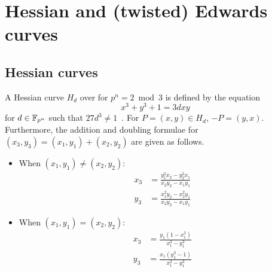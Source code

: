 %
%

\section{Hessian and (twisted) Edwards curves}

\subsection{Hessian curves}
\label{sec:hessian}

%
A Hessian curve $H_d$ over  for $p^n=2\bmod 3$ is defined by
the equation \begin{equation}
  x^3+y^3+1=3dxy \label{eq:hessian-curve} \end{equation} for
$d\in\mathbb F_{p^n}$ such that $27d^3\neq 1$~\cite{DBLP:conf/ches/Smart01}.
%
For $P=(x,y)\in H_d$, $-P=(y,x)$.
%
Furthermore, the addition and doubling formulae for
$(x_3,y_3)=(x_1,y_1)+(x_2,y_2)$ are given as follows.
%
\begin{itemize}
\item When $(x_1,y_1)\neq(x_2,y_2)$:
  \begin{align*}
    x_3 & = \frac{y_1^2x_2 - y_2^2x_1}{x_2y_2 - x_1y_1} \\
    y_3 & = \frac{x_1^2y_2 - x_2^2y_1}{x_2y_2 - x_1y_1}
  \end{align*}
\item When $(x_1,y_1)=(x_2,y_2)$:
  \begin{align*}
    x_3 & = \frac{y_1(1 - x_1^3)}{x_1^3 - y_1^3} \\
    y_3 & = \frac{x_1(y_1^3 - 1)}{x_1^3 - y_1^3}
  \end{align*}
\end{itemize}



